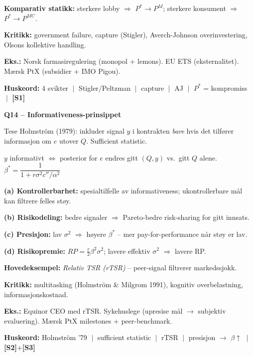 \documentclass[10pt, a4paper]{article}
\newcommand{\SOne}{\textcolor{s1color}{\textbf{[S1]}}}
\newcommand{\STwo}{\textcolor{s2color}{\textbf{[S2]}}}
\newcommand{\SThree}{\textcolor{s3color}{\textbf{[S3]}}}
\newcommand{\qhead}[2]{%
  \noindent
  \begin{tcolorbox}[colback=boxborder, colframe=boxborder, arc=2pt, left=6pt, right=6pt, top=2pt, bottom=2pt]
    \color{white}\textbf{\large Q#1 -- #2}
  \end{tcolorbox}
}
\newcommand{\huskeord}[1]{%
  \vspace{2pt}
  \begin{tcolorbox}[colback=yellow!15, colframe=orange!70!black, boxrule=0.4pt, arc=2pt, left=4pt, right=4pt, top=2pt, bottom=2pt]
    \footnotesize\textbf{Huskeord:} #1
  \end{tcolorbox}
}
\begin{document}
\textbf{Komparativ statikk:} sterkere lobby $\Rightarrow$ $P^{*} \to P^{M}$; sterkere konsument $\Rightarrow$ $P^{*} \to P^{MC}$.

\textbf{Kritikk:} government failure, capture (Stigler), Averch-Johnson overinvestering, Olsons kollektive handling.

\textbf{Eks.:} Norsk farmasiregulering (monopol + lemons). EU ETS (eksternalitet). Mærsk PtX (subsidier + IMO Pigou).

\huskeord{4 svikter $\;\big|\;$ Stigler/Peltzman $\;\big|\;$ capture $\;\big|\;$ AJ $\;\big|\;$ $P^{*}$ = kompromiss $\;\big|\;$ \SOne}

\vfill\newpage

\qhead{14}{Informativeness-prinsippet}

\begin{keybox}{Tese}
Holmström (1979): inkluder signal $y$ i kontrakten \emph{bare} hvis det tilfører informasjon om $e$ utover $Q$. Sufficient statistic.
\end{keybox}

\begin{formulabox}
$y$ informativt $\Leftrightarrow$ posterior for $e$ endres gitt $(Q, y)$ vs.\ gitt $Q$ alene. \\
$\beta^{*} = \dfrac{1}{1 + r \sigma^{2} c'' / \alpha^{2}}$
\end{formulabox}

\textbf{(a) Kontrollerbarhet:} spesialtilfelle av informativeness; ukontrollerbare mål kan filtrere felles støy.

\textbf{(b) Risikodeling:} bedre signaler $\Rightarrow$ Pareto-bedre risk-sharing for gitt innsats.

\textbf{(c) Presisjon:} lav $\sigma^{2}$ $\Rightarrow$ høyere $\beta^{*}$ -- mer pay-for-performance når støy er lav.

\textbf{(d) Risikopremie:} $RP = \tfrac{r}{2}\beta^{2}\sigma^{2}$; lavere effektiv $\sigma^{2}$ $\Rightarrow$ lavere RP.

\textbf{Hovedeksempel:} \emph{Relativ TSR (rTSR)} -- peer-signal filtrerer markedssjokk.

\textbf{Kritikk:} multitasking (Holmström \& Milgrom 1991), kognitiv overbelastning, informasjonskostnad.

\textbf{Eks.:} Equinor CEO med rTSR. Sykehuslege (upresise mål $\to$ subjektiv evaluering). Mærsk PtX milestones + peer-benchmark.

\huskeord{Holmström '79 $\;\big|\;$ sufficient statistic $\;\big|\;$ rTSR $\;\big|\;$ presisjon $\to$ $\beta\uparrow$ $\;\big|\;$ \STwo+\SThree}
\end{document}
